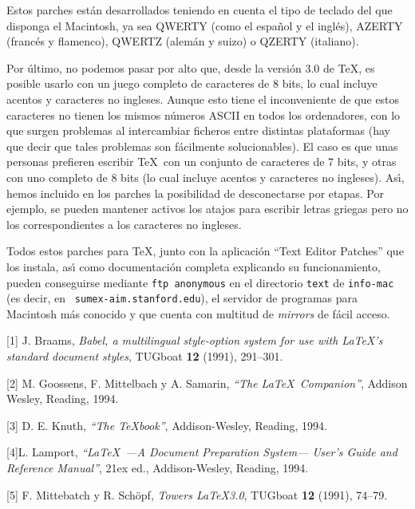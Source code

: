 Estos parches est\'an desarrollados teniendo en cuenta el tipo de teclado del
que disponga el Macintosh, ya sea QWERTY (como el espa\~nol y el ingl\'es),
AZERTY (franc\'es y flamenco), QWERTZ (alem\'an y suizo) o QZERTY (italiano).

Por \'ultimo, no podemos pasar por alto que, desde la versi\'on 3.0 de \TeX,
es posible usarlo con un juego completo de caracteres de 8 bits, lo cual
incluye acentos y caracteres no ingleses. Aunque esto tiene el inconveniente
de que estos caracteres no tienen los mismos n\'umeros ASCII en todos los
ordenadores, con lo que surgen problemas al intercambiar ficheros entre
distintas plataformas (hay que decir que tales problemas son f\'acilmente
solucionables). El caso es que unas personas prefieren escribir \TeX\ con un
conjunto de caracteres de 7 bits, y otras con uno completo de 8 bits (lo cual
incluye acentos y caracteres no ingleses). As\'{\i}, hemos incluido en los
parches la posibilidad de desconectarse por etapas. Por ejemplo, se pueden
mantener activos los atajos para escribir letras griegas pero no los
correspondientes a los caracteres no ingleses.

Todos estos parches para \TeX, junto con la aplicaci\'on ``Text Editor
Patches'' que los instala, as\'{\i} como documentaci\'on completa explicando
su funcionamiento, pueden conseguirse mediante {\tt ftp anonymous} en el
directorio {\tt text} de {\tt info-mac} (es decir, en {\tt
sumex-aim.stanford.edu}), el servidor de programas para Macintosh m\'as
conocido y que cuenta con multitud de {\it mirrors\/} de f\'acil acceso.



\item{[1]} {\sc J. Braams}, {\it Babel, a multilingual style-option system for
use with \LaTeX's standard document styles}, TUGboat {\bf 12} (1991), 291--301.

\item{[2]} {\sc M. Goossens, F. Mittelbach y A. Samarin}, {\it ``The \LaTeX\
Companion''}, Addison Wesley, Reading, 1994.

\item{[3]} {\sc D. E. Knuth}, {\it ``The \TeX book''}, Addison-Wesley, Reading,
1994.

\item{[4]}{\sc  L. Lamport}, {\it ``\LaTeX\ ---A Document Preparation System---
User's Guide and Reference Manual''}, 2\raise1ex\hbox{\underbar{\sevenrm a}}
ed., Addison-Wesley, Reading, 1994.

\item{[5]} {\sc F. Mittebatch y R. Sch\"opf}, {\it Towers \LaTeX3.0}, TUGboat
{\bf 12} (1991), 74--79.

\bye
